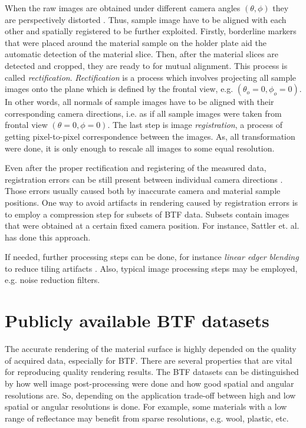 When the raw images are obtained under different camera angles $(\theta,\phi)$ they are perspectively distorted \cite{sattler-2003-efficient}.
Thus, sample image have to be aligned with each other and spatially registered to be further exploited.
Firstly, borderline markers that were placed around the material sample on the holder plate aid the automatic detection of the material slice.
Then, after the material slices are detected and cropped, they are ready to for mutual alignment. This process is called  \emph{rectification}. 
\emph{Rectification} is a process which involves projecting all sample images onto the plane which is defined by the frontal view, e.g. $(\theta _{o} =0,\phi _{o}=0)$.
In other words, all normals of sample images have to be aligned with their corresponding camera directions, i.e. as if all sample images were taken from frontal view $(\theta =0,\phi=0)$.
The last step is image \emph{registration}, a process of getting pixel-to-pixel correspondence between the images.
 As, all transformation were done, it is only enough to rescale all images to some equal resolution.


Even after the proper rectiﬁcation and registering of the measured data, registration errors can be still present between individual camera directions \cite{haindl_visual}. 
Those errors usually caused both by inaccurate camera and material sample positions.
One way to avoid artifacts in rendering caused by registration errors is to employ a compression step for subsets of BTF data. 
Subsets contain images that were obtained at a certain fixed camera position. For instance, Sattler et. al. \cite{sattler-2003-efficient} has done this approach.



If needed, further processing steps can be done, for instance \emph{linear edger blending} to reduce tiling artifacts \cite{sattler-2003-efficient}.
Also, typical image processing steps may be employed, e.g. noise reduction filters. 


\section{Publicly available BTF datasets}
\label{section:Publicly_datasets}	


The accurate rendering of the material surface is highly depended on the quality of acquired data, especially for BTF.
There are several properties that are vital for reproducing quality rendering results.
The BTF datasets can be distinguished by how well image post-processing were done and how good spatial and angular resolutions are.
So, depending on the application trade-off between high and low spatial or angular resolutions is done.
 For example, some materials with a low range of reflectance may benefit from sparse resolutions, e.g. wool, plastic, etc.
 
